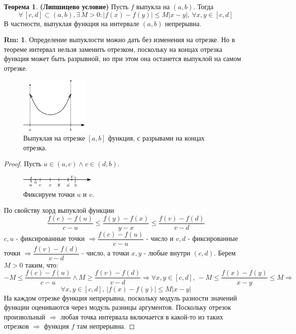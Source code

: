 \documentclass[12pt]{article}
\theoremstyle{definition}
\newtheorem{rem}{Rm:}
\newtheorem{theorem}{Теорема}
\begin{document}
\begin{theorem}\textbf{(Липшицево условие)}
	Пусть $f$ выпукла на $(a,b)$. Тогда 
	$$\forall \, [c,d] \subset (a,b), \exists \, M > 0 \colon |f(x) - f(y)| \leq M|x - y|, \, \forall x,y \in [c,d]$$ 
	В частности, выпуклая функция на интервале $(a,b)$ непрерывна.
\end{theorem}
\begin{rem}
	Определение выпуклости можно дать без изменения на отрезке. Но в теореме интервал нельзя заменить отрезком, поскольку на концах отрезка функция может быть разрывной, но при этом она останется выпуклой на самом отрезке.
\end{rem}
\begin{figure}[H]
	\centering
	\includegraphics[width=0.3\textwidth]{27_7.eps}
	\caption{Выпуклая на отрезке $[a,b]$ функция, с разрывами на концах отрезка.}
	\label{27_7}
\end{figure}
\begin{proof}
	Пусть $u \in (a,c) \wedge v \in (d,b)$. 
	\begin{figure}[H]
		\centering
		\includegraphics[width=0.33\textwidth]{27_8.eps}
		\caption{Фиксируем точки $u$ и $v$.}
		\label{27_8}
	\end{figure}
	По свойству хорд выпуклой функции 
	$$\dfrac{f(c) - f(u)}{c-u} \leq \dfrac{f(y) - f(x)}{y - x} \leq \dfrac{f(v) - f(d)}{v-d}$$
	$c, u$ - фиксированные точки $\Rightarrow \dfrac{f(c) - f(u)}{c-u}$ - число и $v, d$ - фиксированные точки $\Rightarrow \dfrac{f(v) - f(d)}{v-d}$ - число, а точки $x,y$ - любые внутри $(c,d)$. Берем $M>0$ таким, что: 
	$$-M \leq \dfrac{f(c) - f(u)}{c-u} \wedge M \geq  \dfrac{f(v) - f(d)}{v-d} \Rightarrow \forall x,y \in [c,d],\, -M \leq \dfrac{f(x) - f(y)}{x - y} \leq M \Rightarrow$$
	$$\forall x,y \in [c,d],\, |f(x) - f(y)| \leq M|x-y|$$
	На каждом отрезке функция непрерывна, поскольку модуль разности значений функции оцениваются через модуль разницы аргументов. Поскольку отрезок произвольный $\Rightarrow$ любая точка интервала включается в какой-то из таких отрезков $\Rightarrow$ функция $f$ там непрерывна.
\end{proof}
\end{document}
